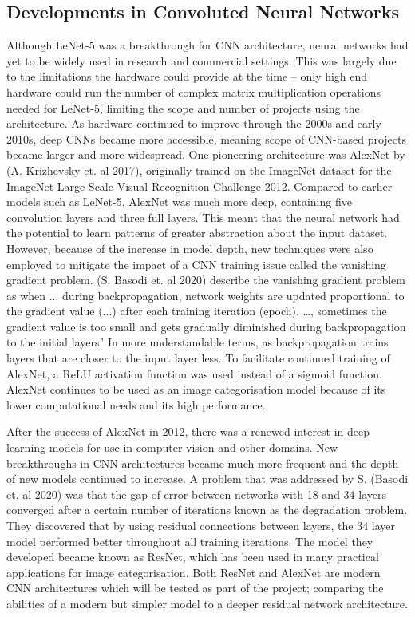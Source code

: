 \documentclass[12pt,runningheads]{llncs}
\begin{document}
\subsection{Developments in Convoluted Neural Networks}
Although LeNet-5 was a breakthrough for CNN architecture, neural
networks had yet to be widely used in research and commercial settings.
This was largely due to the limitations the hardware could provide at
the time -- only high end hardware could run the number of complex
matrix multiplication operations needed for LeNet-5, limiting the
scope and number of projects using the architecture. As hardware
continued to improve through the 2000s and early 2010s, deep CNNs became
more accessible, meaning scope of CNN-based projects became larger and
more widespread. One pioneering architecture was AlexNet by (A.
Krizhevsky et. al 2017), originally trained on the ImageNet dataset
for the ImageNet Large Scale Visual Recognition Challenge 2012.
Compared to earlier models such as LeNet-5, AlexNet was much
more deep, containing five convolution layers and three full layers.
This meant that the neural network had the potential to learn patterns
of greater abstraction about the input dataset. However, because of the
increase in model depth, new techniques were also employed to mitigate
the impact of a CNN training issue called the vanishing gradient
problem. (S. Basodi et. al 2020) describe the vanishing gradient problem
as when ... during backpropagation, network weights are updated
proportional to the gradient value (...) after each training iteration
(epoch). \ldots, sometimes the gradient value is too small and gets
gradually diminished during backpropagation to the initial layers.' In
more understandable terms, as backpropagation trains layers that are
closer to the input layer less. To facilitate continued training of
AlexNet, a ReLU activation function was used instead of a sigmoid
function. AlexNet continues to be used as an image categorisation
model because of its lower computational needs and its high
performance.

After the success of AlexNet in 2012, there was a renewed interest
in deep learning models for use in computer vision and other domains.
New breakthroughs in CNN architectures became much more frequent and the
depth of new models continued to increase. A problem that was addressed
by S. (Basodi et. al 2020) was that the gap of error between networks
with 18 and 34 layers converged after a certain number of iterations
known as the degradation problem. They discovered that by using residual
connections between layers, the 34 layer model performed better
throughout all training iterations. The model they developed became
known as ResNet, which has been used in many practical applications
for image categorisation. Both ResNet and AlexNet are modern CNN
architectures which will be tested as part of the project; comparing the
abilities of a modern but simpler model to a deeper residual network
architecture.
\end{document}
